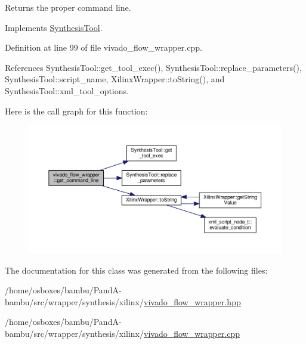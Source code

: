 Returns the proper command line. 



Implements \hyperlink{classSynthesisTool_a8eb2ef7a6230a997a2467d298613c045}{Synthesis\+Tool}.



Definition at line 99 of file vivado\+\_\+flow\+\_\+wrapper.\+cpp.



References Synthesis\+Tool\+::get\+\_\+tool\+\_\+exec(), Synthesis\+Tool\+::replace\+\_\+parameters(), Synthesis\+Tool\+::script\+\_\+name, Xilinx\+Wrapper\+::to\+String(), and Synthesis\+Tool\+::xml\+\_\+tool\+\_\+options.

Here is the call graph for this function\+:
\nopagebreak
\begin{figure}[H]
\begin{center}
\leavevmode
\includegraphics[width=350pt]{d0/da9/classvivado__flow__wrapper_a26a19ae9d3f2cd1682a06873348f7731_cgraph}
\end{center}
\end{figure}


The documentation for this class was generated from the following files\+:\begin{DoxyCompactItemize}
\item 
/home/osboxes/bambu/\+Pand\+A-\/bambu/src/wrapper/synthesis/xilinx/\hyperlink{vivado__flow__wrapper_8hpp}{vivado\+\_\+flow\+\_\+wrapper.\+hpp}\item 
/home/osboxes/bambu/\+Pand\+A-\/bambu/src/wrapper/synthesis/xilinx/\hyperlink{vivado__flow__wrapper_8cpp}{vivado\+\_\+flow\+\_\+wrapper.\+cpp}\end{DoxyCompactItemize}
